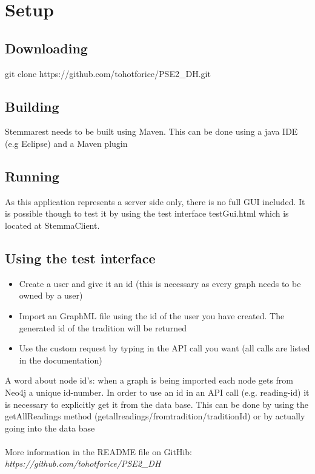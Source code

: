 \documentclass[11pt,fleqn,openany]{book} %
\begin{document}
\chapter{Setup}

\section*{Downloading}

git clone https://github.com/tohotforice/PSE2\_DH.git

\section*{Building}

Stemmarest needs to be built using Maven. This can be done using a java IDE (e.g Eclipse) and a Maven plugin

\section*{Running}

As this application represents a server side only, there is no full GUI included. It is possible though to test it by using the test interface testGui.html which is located at StemmaClient.

\section*{Using the test interface}

\begin{itemize}
\item Create a user and give it an id (this is necessary as every graph needs to be owned by a user)
\item Import an GraphML file using the id of the user you have created. The generated id of the tradition will be returned
\item Use the custom request by typing in the API call you want (all calls are listed in the documentation)
\end{itemize}
A word about node id's: when a graph is being imported each node gets from Neo4j a unique id-number. In order to use an id in an API call (e.g. reading-id) it is necessary to explicitly get it from the data base. This can be done by using the getAllReadings method (getallreadings/fromtradition/{traditionId}) or by actually going into the data base \\ \quad \\ More information in the README file on GitHib: \textit{https://github.com/tohotforice/PSE2\_DH}
\end{document}
